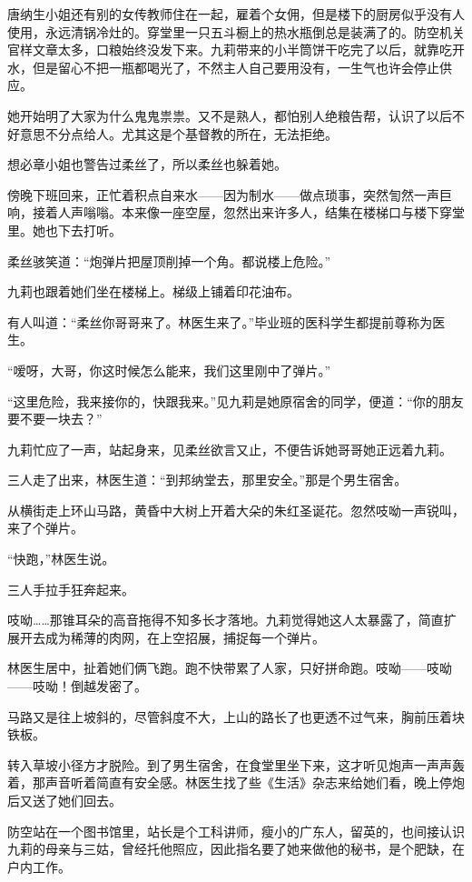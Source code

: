 \par 唐纳生小姐还有别的女传教师住在一起，雇着个女佣，但是楼下的厨房似乎没有人使用，永远清锅冷灶的。穿堂里一只五斗橱上的热水瓶倒总是装满了的。防空机关官样文章太多，口粮始终没发下来。九莉带来的小半筒饼干吃完了以后，就靠吃开水，但是留心不把一瓶都喝光了，不然主人自己要用没有，一生气也许会停止供应。
\par 她开始明了大家为什么鬼鬼祟祟。又不是熟人，都怕别人绝粮告帮，认识了以后不好意思不分点给人。尤其这是个基督教的所在，无法拒绝。
\par 想必章小姐也警告过柔丝了，所以柔丝也躲着她。
\par 傍晚下班回来，正忙着积点自来水——因为制水——做点琐事，突然訇然一声巨响，接着人声嗡嗡。本来像一座空屋，忽然出来许多人，结集在楼梯口与楼下穿堂里。她也下去打听。
\par 柔丝骇笑道：“炮弹片把屋顶削掉一个角。都说楼上危险。”
\par 九莉也跟着她们坐在楼梯上。梯级上铺着印花油布。
\par 有人叫道：“柔丝你哥哥来了。林医生来了。”毕业班的医科学生都提前尊称为医生。
\par “嗳呀，大哥，你这时候怎么能来，我们这里刚中了弹片。”
\par “这里危险，我来接你的，快跟我来。”见九莉是她原宿舍的同学，便道：“你的朋友要不要一块去？”
\par 九莉忙应了一声，站起身来，见柔丝欲言又止，不便告诉她哥哥她正远着九莉。
\par 三人走了出来，林医生道：“到邦纳堂去，那里安全。”那是个男生宿舍。
\par 从横街走上环山马路，黄昏中大树上开着大朵的朱红圣诞花。忽然吱呦一声锐叫，来了个弹片。
\par “快跑，”林医生说。
\par 三人手拉手狂奔起来。
\par 吱呦……那锥耳朵的高音拖得不知多长才落地。九莉觉得她这人太暴露了，简直扩展开去成为稀薄的肉网，在上空招展，捕捉每一个弹片。
\par 林医生居中，扯着她们俩飞跑。跑不快带累了人家，只好拼命跑。吱呦——吱呦——吱呦！倒越发密了。
\par 马路又是往上坡斜的，尽管斜度不大，上山的路长了也更透不过气来，胸前压着块铁板。
\par 转入草坡小径方才脱险。到了男生宿舍，在食堂里坐下来，这才听见炮声一声声轰着，那声音听着简直有安全感。林医生找了些《生活》杂志来给她们看，晚上停炮后又送了她们回去。
\par 防空站在一个图书馆里，站长是个工科讲师，瘦小的广东人，留英的，也间接认识九莉的母亲与三姑，曾经托他照应，因此指名要了她来做他的秘书，是个肥缺，在户内工作。
